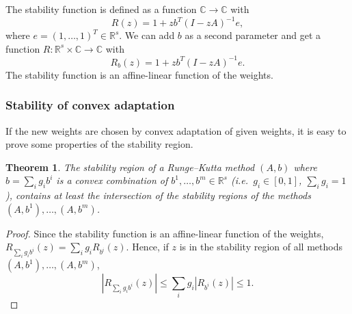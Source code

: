 \documentclass[a4paper]{article}
\numberwithin{equation}{section}
\theoremstyle{plain}
\newtheorem{theorem}{Theorem}
\theoremstyle{definition}
\numberwithin{theorem}{section}
\newcommand{\R}{\mathbb{R}}
\newcommand{\CN}{\mathbb{C}}
\newcommand{\1}{\mathbbm{1}}
\begin{document}
The stability function is defined as a function $\CN \to \CN$ with
\begin{equation}
R(z) = 1 + zb^T(I - zA)^{-1}e,
\end{equation}
where $e = (1, \dots, 1)^T \in \R^s$.
We can add $b$ as a second parameter and get a function
$R\colon \R^s \times \CN  \to \CN$ with
\begin{equation}
R_b(z) = 1 + zb^T(I - zA)^{-1}e.
\end{equation}
The stability function is an affine-linear function of the weights.



\subsubsection{Stability of convex adaptation}

If the new weights are chosen by convex adaptation of given weights,
it is easy to prove some properties of the stability region.
\begin{theorem}
  The stability region of a Runge--Kutta method $(A,b)$ where
  $b = \sum_{i} g_i b^i$ is a convex combination of
  $b^1, \dots, b^m \in \R^s$ (i.e.\ $g_i \in [0,1]$, $\sum_i g_i = 1$),
  contains at least the intersection of the stability regions of
  the methods $(A,b^1), \dots, (A,b^m)$.
\end{theorem}
\begin{proof}
  Since the stability function is an affine-linear function of the
  weights, $R_{\sum_i g_i b^i}(z) = \sum_i g_i R_{b^i}(z)$. Hence,
  if $z$ is in the stability region of all methods $(A,b^1), \dots, (A,b^m)$,
  \begin{equation}
    | R_{\sum_i g_i b^i}(z) |
    \le
    \sum_i g_i | R_{b^i}(z) |
    \le
    1.
  \end{equation}
\end{proof}
\end{document}
